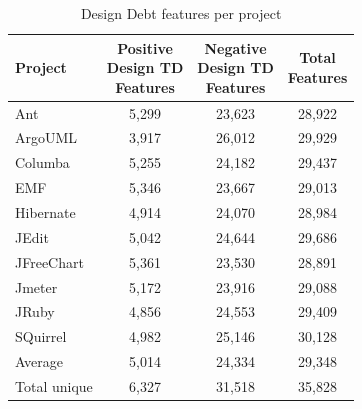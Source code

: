 \clearpage

\begin{table}[!hbt]
    \begin{center}
        \caption{Design Debt features per project}
        \label{tbl:design_features_per_project}
        \begin{tabular}{l| c c c }
        \toprule
        \textbf{Project} & \thead{Positive\\Design TD\\Features} & \thead{Negative\\Design TD\\Features} & \thead{Total\\Features} \\
        \midrule
        Ant          &5,299 & 23,623 &28,922 \\
        ArgoUML      &3,917 & 26,012 &29,929 \\
        Columba      &5,255 & 24,182 &29,437 \\
        EMF          &5,346 & 23,667 &29,013 \\
        Hibernate    &4,914 & 24,070 &28,984 \\
        JEdit        &5,042 & 24,644 &29,686 \\
        JFreeChart   &5,361 & 23,530 &28,891 \\
        Jmeter       &5,172 & 23,916 &29,088 \\
        JRuby        &4,856 & 24,553 &29,409 \\
        SQuirrel     &4,982 & 25,146 &30,128 \\
        \midrule
        Average       & 5,014  & 24,334 & 29,348  \\      
        Total unique  & 6,327  & 31,518 & 35,828  \\
        \bottomrule
        \end{tabular}
    \end{center}    
\end{table}

